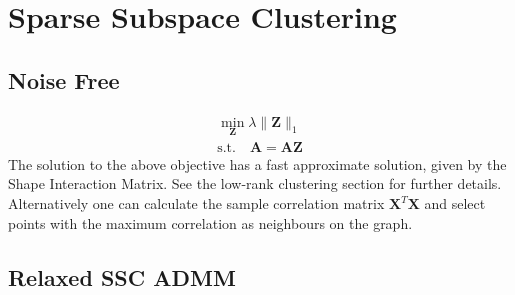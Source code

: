 \documentclass{article}
\begin{document}
\newpage
\section{Sparse Subspace Clustering}

\subsection{Noise Free}

\begin{align}
\min_{\mathbf Z} \lambda\|\mathbf Z\|_{1} \\
\text{s.t.} \quad \mathbf{A = AZ} \nonumber
\end{align}
The solution to the above objective has a fast approximate solution, given by the Shape Interaction Matrix. See the low-rank clustering section for further details. Alternatively one can calculate the sample correlation matrix $\mathbf X^T \mathbf X$ and select points with the maximum correlation as neighbours on the graph.

\subsection{Relaxed SSC ADMM}
\end{document}
